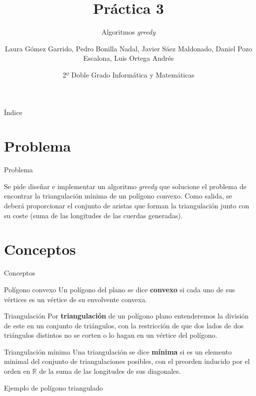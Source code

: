 \documentclass[compress]{beamer}
\title{Práctica 3}                                               %
\subtitle{Algoritmos \textit{greedy}}                                  %
\author{Laura Gómez Garrido, Pedro Bonilla Nadal, Javier Sáez Maldonado, Daniel Pozo Escalona, Luis Ortega Andrés}
\date{2º Doble Grado Informática y Matemáticas}                                                            %
\begin{document}
\begin{frame}
\titlepage
\end{frame}

\begin{frame}{Índice}
  \hypertarget{index}{}
  \tableofcontents
  
\end{frame}

\section{Problema}
\begin{frame}{Problema}

	Se pide diseñar e implementar un algoritmo \textit{greedy} que solucione el problema de encontrar la triangulación mínima de un polígono convexo. Como salida, se deberá proporcionar el conjunto de aristas que forman la triangulación junto con su coste (suma de las longitudes de las cuerdas generadas).

\end{frame}	

\section{Conceptos}
\begin{frame}{Conceptos}
	
\begin{block}{Polígono convexo}
Un polígono del plano se dice \textbf{convexo} si cada uno de sus vértices es un vértice de su envolvente convexa.
\end{block}
\pause
\begin{block}{Triangulación}
 Por \textbf{triangulación} de un polígono plano entenderemos la división de este en un conjunto de triángulos, con la restricción de que dos lados de dos triángulos distintos no se corten o lo hagan en un vértice del polígono.
\end{block}
\pause
\begin{block}{Triangulación mínima}
Una triangulación se dice \textbf{mínima} si es un elemento minimal del conjunto de triangulaciones posibles, con el preorden inducido por el orden en $\mathbb{R}$ de la suma de las longitudes de sus diagonales.
\end{block}

\end{frame}	

\begin{frame}{Ejemplo de polígono triangulado}
\begin{center}

\end{center}

\end{frame}
\end{document}
